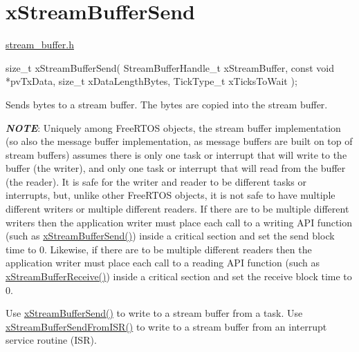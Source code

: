 \hypertarget{group__x_stream_buffer_send}{}\section{x\+Stream\+Buffer\+Send}
\label{group__x_stream_buffer_send}
\hyperlink{stream__buffer_8h}{stream\+\_\+buffer.\+h}


\begin{DoxyPre}
size\_t xStreamBufferSend( StreamBufferHandle\_t xStreamBuffer,
                       const void *pvTxData,
                       size\_t xDataLengthBytes,
                       TickType\_t xTicksToWait );
\end{DoxyPre}


Sends bytes to a stream buffer. The bytes are copied into the stream buffer.

{\itshape {\bfseries N\+O\+TE}}\+: Uniquely among Free\+R\+T\+OS objects, the stream buffer implementation (so also the message buffer implementation, as message buffers are built on top of stream buffers) assumes there is only one task or interrupt that will write to the buffer (the writer), and only one task or interrupt that will read from the buffer (the reader). It is safe for the writer and reader to be different tasks or interrupts, but, unlike other Free\+R\+T\+OS objects, it is not safe to have multiple different writers or multiple different readers. If there are to be multiple different writers then the application writer must place each call to a writing A\+PI function (such as \hyperlink{stream__buffer_8h_a35cdf3b6bf677086b9128782f762499d}{x\+Stream\+Buffer\+Send()}) inside a critical section and set the send block time to 0. Likewise, if there are to be multiple different readers then the application writer must place each call to a reading A\+PI function (such as \hyperlink{stream__buffer_8h_a55efc144b988598d84a6087d3e20b507}{x\+Stream\+Buffer\+Receive()}) inside a critical section and set the receive block time to 0.

Use \hyperlink{stream__buffer_8h_a35cdf3b6bf677086b9128782f762499d}{x\+Stream\+Buffer\+Send()} to write to a stream buffer from a task. Use \hyperlink{stream__buffer_8h_a1dab226e99230e01e79bc2b5c0605e44}{x\+Stream\+Buffer\+Send\+From\+I\+S\+R()} to write to a stream buffer from an interrupt service routine (I\+SR).


